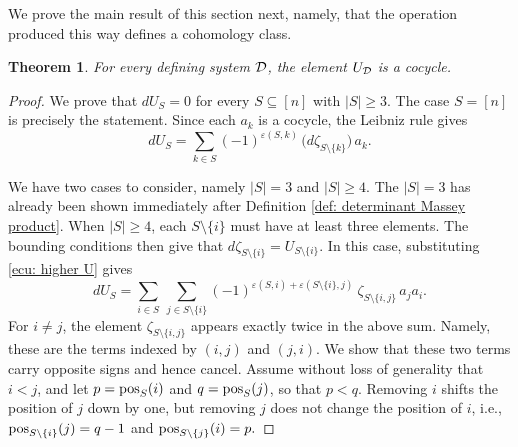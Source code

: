 \documentclass[11pt]{article}
\newtheorem{theorem}{Theorem}[section]
\theoremstyle{definition}
\theoremstyle{definition}
\begin{document}
We prove the main result of this section next, namely, that the operation produced this way defines a cohomology class.
\begin{theorem}
\label{thm: higher cocycle}
For every defining system $\mathcal D$, the element $U_{\mathcal D}$ is a cocycle.
\end{theorem}

\begin{proof}
We prove that $dU_S=0$ for every $S\subseteq[n]$ with $|S|\geq 3$.
The case $S=[n]$ is precisely the statement.
Since each $a_k$ is a cocycle, the Leibniz rule gives
\begin{equation*}
dU_S=\sum_{k\in S}(-1)^{\varepsilon(S,k)}\,\bigl(d\zeta_{S\setminus\{k\}}\bigr)\,a_k .
\end{equation*}

We have two cases to consider, namely $|S|=3$ and $|S|\geq 4$.
The $|S|=3$ has already been shown immediately after Definition \ref{def: determinant Massey product}.
%
%
When $|S|\ge 4$, each $S\setminus\{i\}$ must have at least three elements. 
 The bounding conditions then give that $d\zeta_{S\setminus\{i\}}=U_{S\setminus\{i\}}$.
In this case, substituting \eqref{ecu: higher U} gives
\begin{equation*}
dU_S=\sum_{i\in S}\ \sum_{j\in S\setminus\{i\}} (-1)^{\varepsilon(S,i)+\varepsilon(S\setminus\{i\},j)}\ \zeta_{S\setminus\{i,j\}}\,a_ja_i .
\end{equation*}
For $i\neq j$, the element $\zeta_{S\setminus\{i,j\}}$ appears exactly twice in the above sum. 
Namely, these are the terms indexed by $(i,j)$ and $(j,i)$.
We show that these two terms carry opposite signs and hence cancel.
Assume without loss of generality that $i<j$, and let $p=\operatorname{\mathrm{pos}}_S(i)$ and $q=\operatorname{\mathrm{pos}}_S(j)$, so that $p<q$.
Removing $i$ shifts the position of $j$ down by one, but removing $j$ does not change the position of $i$, i.e., $\operatorname{\mathrm{pos}}_{S\setminus\{i\}}(j)=q-1$ and $\operatorname{\mathrm{pos}}_{S\setminus\{j\}}(i)=p.$

\end{proof}
\end{document}
